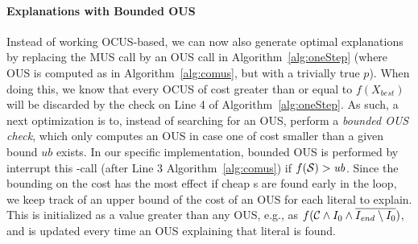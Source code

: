 \paragraph{Explanations with Bounded OUS}
Instead of working OCUS-based, we can now also generate optimal explanations by replacing the MUS call by an OUS call  in Algorithm~\ref{alg:oneStep} (where OUS is computed as in Algorithm~\ref{alg:comus}, but with a trivially true $p$). 
When doing this, we know that every OCUS of cost greater than or equal to $f(X_{\mathit{best}})$ will be discarded by the check on Line 4 of Algorithm~\ref{alg:oneStep}.
As such, a next optimization is to, instead of searching for an OUS, perform a \emph{bounded OUS check}, which only computes an OUS in case one of cost smaller than a given bound $\mathit{ub}$ exists.  
In our specific implementation, bounded OUS is performed by interrupt this \omus-call (after Line 3 Algorithm~\ref{alg:comus}) if $f(\mathcal{S}) > \mathit{ub}$.
Since the bounding on the \omus cost has the most effect if cheap \omus{}s are found early in the loop, we keep track of an upper bound of the cost of an OUS for each literal to explain. This is initialized as a value greater than any OUS, e.g., as $f(\mathcal{C}  \land I_0 \land \overline{I_\mathit{end}  \setminus I_0})$, and is updated every time an OUS explaining that literal is found.




